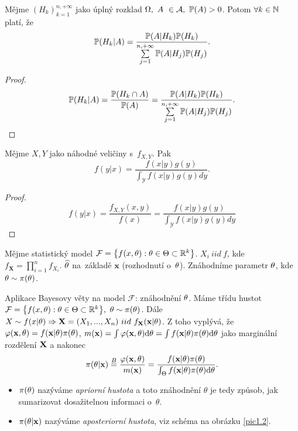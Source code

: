 \begin{theorem}[Bayesova] 
	Mějme $(H_k)_{k=1}^{n,+\infty}$ jako úplný rozklad $\Omega,~A~\in \mathcal{A} , ~\mathbb{P}(A)>0$. Potom $\forall k\in\mathbb{N}$ platí, že 
	\[
	\mathbb{P}(H_k|A)=\frac{\mathbb{P}(A|H_k)\mathbb{P}(H_k)}{\sum\limits_{j=1}^{n,+\infty}\mathbb{P}(A|H_j)\mathbb{P}(H_j)}.
	\]
	\begin{proof}
		$$\mathbb{P}(H_k|A)=\frac{\mathbb{P}(H_k\cap A)}{\mathbb{P}(A)}=\frac{\mathbb{P}(A|H_k)\mathbb{P}(H_k)}{\sum\limits_{j=1}^{n,+\infty}\mathbb{P}(A|H_j)\mathbb{P}(H_j)}.$$
	\end{proof}
\end{theorem}
\begin{theorem}
	Mějme $X,Y$ jako náhodné veličiny s~$f_{X,Y}$. Pak
	$$ f(y|x)=\frac{f(x|y)g(y)}{\int_{\mathcal{Y}}f(x|y)g(y)dy}. $$
\begin{proof}
$$ f(y|x)=\frac{f_{X,Y}(x,y)}{f(x)}=\frac{f(x|y)g(y)}{\int_{\mathcal{Y}}f(x|y)g(y)dy} $$
\end{proof}

\end{theorem}

Mějme statistický model $\mathcal{F}=\big\{ f(x,\theta):\theta\in\Theta\subset\mathbb{R}^k \big\}$.
$X_i~iid~f$, kde $f_\textbf{X}=\prod_{i=1}^n f_{X_i}$. $\widehat{\theta}$ na~základě $\textbf{x}$ (rozhodnutí o~$\theta$). Znáhodníme parametr $\theta$, kde $\theta\sim\pi(\theta)$.

Aplikace Bayesovy věty na model $\mathcal{F}$: znáhodnění $\theta$. Máme třídu hustot $\mathcal{F}=\big\{f(x,\theta):\theta\in\Theta\subset\mathbb{R}^k\big\},~\theta\sim\pi(\theta)$. Dále $X\sim f(x|\theta)\Rightarrow \textbf{X}=(X_1,...,X_n)~iid~f_{\textbf{X}}(\textbf{x}|\theta)$.
Z toho vyplývá, že $\varphi(\textbf{x},\theta)=f(\textbf{x}|\theta)\pi(\theta)$, $m(\textbf{x})=\int\varphi(\textbf{x},\theta)\mathrm{d} \theta=\int f(\textbf{x}|\theta)\pi(\theta)\mathrm{d}\theta$ jako marginální rozdělení $\textbf{X}$ a nakonec 
	$$ \pi(\theta|\textbf{x})\stackrel{B}{=}\frac{\varphi(\textbf{x},\theta)}{m(\textbf{x})}=\frac{f(\textbf{x}|\theta)\pi(\theta)}{\int_\Theta f(\textbf{x}|\theta)\pi(\theta)\mathrm{d}\theta}. $$
	\begin{itemize}
	\item 	$\pi(\theta)$ nazýváme \textit{apriorní hustota} a toto znáhodnění $\theta$ je tedy způsob, jak sumarizovat dosažitelnou informaci o~$\theta$.
	\item   $\pi(\theta|\textbf{x})$ nazýváme \textit{aposteriorní hustota}, viz schéma na obrázku \ref{pic1.2}.
	\end{itemize}

